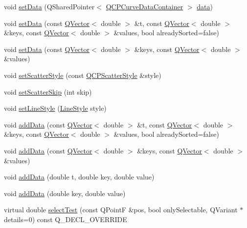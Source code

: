 \begin{DoxyCompactItemize}
\item 
void \hyperlink{class_q_c_p_curve_a41246850d2e080bc57183ca19cd4135e}{set\+Data} (Q\+Shared\+Pointer$<$ \hyperlink{class_q_c_p_data_container}{Q\+C\+P\+Curve\+Data\+Container} $>$ \hyperlink{class_q_c_p_curve_ad89c71fdd1726506c21c0cc471547368}{data})
\item 
void \hyperlink{class_q_c_p_curve_a0768af2c33c8dcffa3cf5bdeb53923a6}{set\+Data} (const \hyperlink{class_q_vector}{Q\+Vector}$<$ double $>$ \&t, const \hyperlink{class_q_vector}{Q\+Vector}$<$ double $>$ \&keys, const \hyperlink{class_q_vector}{Q\+Vector}$<$ double $>$ \&values, bool already\+Sorted=false)
\item 
void \hyperlink{class_q_c_p_curve_a9d3245d43304226e013240c94802f7f6}{set\+Data} (const \hyperlink{class_q_vector}{Q\+Vector}$<$ double $>$ \&keys, const \hyperlink{class_q_vector}{Q\+Vector}$<$ double $>$ \&values)
\item 
void \hyperlink{class_q_c_p_curve_a55e43b44709bf50a35500644988aa706}{set\+Scatter\+Style} (const \hyperlink{class_q_c_p_scatter_style}{Q\+C\+P\+Scatter\+Style} \&style)
\item 
void \hyperlink{class_q_c_p_curve_a97dbfecd497e972d5f2162615e6da5be}{set\+Scatter\+Skip} (int skip)
\item 
void \hyperlink{class_q_c_p_curve_a4a377ec863ff81a1875c3094a6177c19}{set\+Line\+Style} (\hyperlink{class_q_c_p_curve_a2710e9f79302152cff794c6e16cc01f1}{Line\+Style} style)
\item 
void \hyperlink{class_q_c_p_curve_a73edf394b94f3f24f07518e30565a07f}{add\+Data} (const \hyperlink{class_q_vector}{Q\+Vector}$<$ double $>$ \&t, const \hyperlink{class_q_vector}{Q\+Vector}$<$ double $>$ \&keys, const \hyperlink{class_q_vector}{Q\+Vector}$<$ double $>$ \&values, bool already\+Sorted=false)
\item 
void \hyperlink{class_q_c_p_curve_a6424fa06da1786648c83ad13a0d0aa14}{add\+Data} (const \hyperlink{class_q_vector}{Q\+Vector}$<$ double $>$ \&keys, const \hyperlink{class_q_vector}{Q\+Vector}$<$ double $>$ \&values)
\item 
void \hyperlink{class_q_c_p_curve_a13398b236f6926014e404eeb5b9f415c}{add\+Data} (double t, double key, double value)
\item 
void \hyperlink{class_q_c_p_curve_ada4762e793cd5707b33f35b8a4b0f8fb}{add\+Data} (double key, double value)
\item 
virtual double \hyperlink{class_q_c_p_curve_a0ed9b7e6b4bc72010d6fcd974af46a8b}{select\+Test} (const Q\+PointF \&pos, bool only\+Selectable, Q\+Variant $\ast$details=0) const Q\+\_\+\+D\+E\+C\+L\+\_\+\+O\+V\+E\+R\+R\+I\+DE

\end{DoxyCompactItemize}
